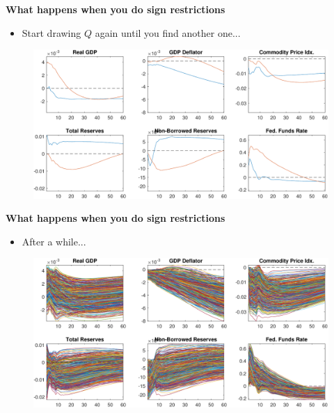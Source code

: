 \begin{frame}
{\textbf{What happens when you do sign restrictions }}

\begin{itemize}
\item Start drawing $Q$ again until you find another one...
\end{itemize}

\begin{figure}[h]
\vspace{.3cm}\includegraphics[width=.8\textwidth]{Uhlig_Replication_2rot.pdf}
\end{figure}
\end{frame}


\begin{frame}
{\textbf{What happens when you do sign restrictions }}

\begin{itemize}
\item After a while...
\end{itemize}

\begin{figure}[h]
\vspace{.3cm}\includegraphics[width=.8%
\textwidth]{Uhlig_Replication_500rot.pdf}
\end{figure}
\end{frame}


